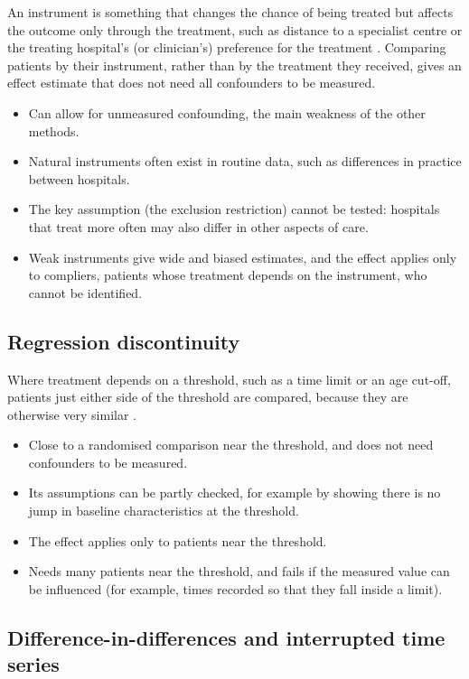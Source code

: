 An instrument is something that changes the chance of being treated but affects the outcome only through the treatment, such as distance to a specialist centre or the treating hospital's (or clinician's) preference for the treatment \cite{baiocchi2014}. Comparing patients by their instrument, rather than by the treatment they received, gives an effect estimate that does not need all confounders to be measured.
\begin{itemize}
\item[$+$] Can allow for unmeasured confounding, the main weakness of the other methods.
\item[$+$] Natural instruments often exist in routine data, such as differences in practice between hospitals.
\item[$-$] The key assumption (the exclusion restriction) cannot be tested: hospitals that treat more often may also differ in other aspects of care.
\item[$-$] Weak instruments give wide and biased estimates, and the effect applies only to compliers, patients whose treatment depends on the instrument, who cannot be identified.
\end{itemize}

\subsection{Regression discontinuity}

Where treatment depends on a threshold, such as a time limit or an age cut-off, patients just either side of the threshold are compared, because they are otherwise very similar \cite{imbens2008rdd}.
\begin{itemize}
\item[$+$] Close to a randomised comparison near the threshold, and does not need confounders to be measured.
\item[$+$] Its assumptions can be partly checked, for example by showing there is no jump in baseline characteristics at the threshold.
\item[$-$] The effect applies only to patients near the threshold.
\item[$-$] Needs many patients near the threshold, and fails if the measured value can be influenced (for example, times recorded so that they fall inside a limit).
\end{itemize}

\subsection{Difference-in-differences and interrupted time series}

